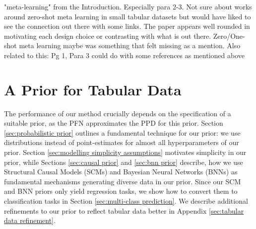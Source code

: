 \documentclass{article}
\DeclareMathOperator*{\E}{\mathbb{E}}
\begin{document}
"meta-learning" from the Introduction. Especially para 2-3. Not sure about works around zero-shot meta learning in small tabular datasets but would have liked to see the connection out there with some links. The paper appears well rounded in motivating each design choice or contrasting with what is out there. Zero/One-shot meta learning maybe was something that felt missing as a mention.
Also related to this: Pg 1, Para 3 could do with some references as mentioned above 
\fi


\section{A Prior for Tabular Data}\label{sec:tabprior}

The performance of our method crucially depends on the specification of a suitable prior, as the PFN approximates the PPD for this prior.
Section \ref{sec:probabilistic prior} outlines a fundamental technique for our prior: we use distributions instead of point-estimates for almost all hyperparameters of our prior. Section \ref{sec:modelling simplicity assumptions} motivates simplicity in our prior, while Sections \ref{sec:causal prior} and \ref{sec:bnn prior} describe, how we use Structural Causal Models (SCMs) and Bayesian Neural Networks (BNNs) as fundamental mechanisms generating diverse data in our prior. Since our SCM and BNN priors only yield regression tasks, we show how to convert them to classification tasks in Section \ref{sec:multi-class prediction}. We describe additional refinements to our prior to reflect tabular data better in Appendix \ref{sec:tabular data refinement}.
%
\end{document}
